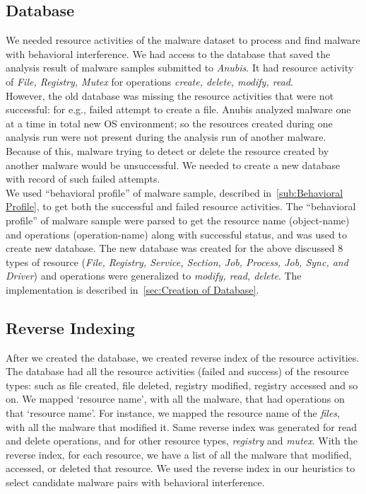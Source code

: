 \subsection{Database}
\label{sub:Database}
We needed resource activities of the malware dataset to process and find malware with behavioral interference.
We had access to the database that saved the analysis result of malware samples submitted to \emph{Anubis}.
It had resource activity of \emph{File, Registry, Mutex} for operations \emph{create, delete, modify, read}.
\\
However, the old database was missing the resource activities that were not successful: for e.g., failed attempt to create a file.
Anubis analyzed malware one at a time in total new OS environment; so the resources created during one analysis run were not present during the analysis run of another malware.
Because of this, malware trying to detect or delete the resource created by another malware would be unsuccessful.
We needed to create a new database with record of such failed attempts.\\
We used ``behavioral profile'' of malware sample, described in~\autoref{sub:Behavioral Profile}, to get both the successful and failed resource activities.
The ``behavioral profile'' of malware sample were parsed to get the resource name (object-name) and operations (operation-name) along with successful status, and was used to create new database.
The new database was created for the above discussed 8 types of resource (\emph{File, Registry, Service, Section, Job, Process, Job, Sync, and Driver}) and operations were generalized to \emph{modify, read, delete}.
The implementation is described in~\autoref{sec:Creation of Database}.

\subsection{Reverse Indexing}
\label{sub:Reverse Indexing}
After we created the database, we created reverse index of the resource activities.
The database had all the resource activities (failed and success) of the resource types: such as file created, file deleted, registry modified, registry accessed and so on.
We mapped `resource name', with all the malware, that had operations on that `resource name'.
For instance, we mapped the resource name of the \emph{files}, with all the malware that modified it.
Same reverse index was generated for read and delete operations, and for other resource types, \emph{registry} and \emph{mutex}.
With the reverse index, for each resource, we have a list of all the malware that modified, accessed, or deleted that resource.
We used the reverse index in our heuristics to select candidate malware pairs with behavioral interference.
